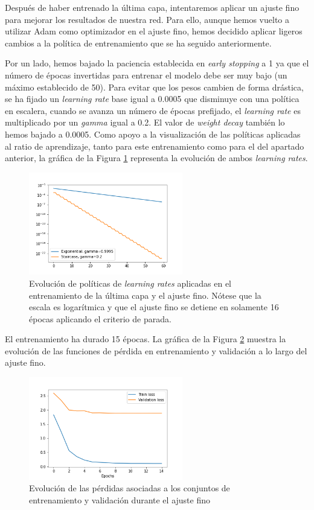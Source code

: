 \documentclass[10pt,a4paper]{article}
\begin{document}
Después de haber entrenado la última capa, intentaremos aplicar un ajuste fino para mejorar los resultados de nuestra red. Para ello, aunque hemos vuelto a utilizar Adam como optimizador en el ajuste fino, hemos decidido aplicar ligeros cambios a la política de entrenamiento que se ha seguido anteriormente. 

Por un lado, hemos bajado la paciencia establecida en \textit{early stopping} a 1 ya que el número de épocas invertidas para entrenar el modelo debe ser muy bajo (un máximo establecido de 50). Para evitar que los pesos cambien de forma drástica, se ha fijado un \textit{learning rate} base igual a 0.0005 que disminuye con una política en escalera, cuando se avanza un número de épocas prefijado, el \textit{learning rate} es multiplicado por un \textit{gamma} igual a 0.2. El valor de \textit{weight decay} también lo hemos bajado a 0.0005. Como apoyo a la visualización de las políticas aplicadas al ratio de aprendizaje, tanto para este entrenamiento como para el del apartado anterior, la gráfica de la Figura \ref{fig:lr_policies} representa la evolución de ambos \textit{learning rates}.

\begin{figure}[h]
	\centering
	\includegraphics[width=0.6\textwidth]{lr_policies}
	\caption{Evolución de políticas de \textit{learning rates} aplicadas en el entrenamiento de la última capa y el ajuste fino. Nótese que la escala es logarítmica y que el ajuste fino se detiene en solamente 16 épocas aplicando el criterio de parada.}
	\label{fig:lr_policies}
\end{figure}


El entrenamiento ha durado 15 épocas. La gráfica de la Figura \ref{fig:loss_cifar_ft} muestra la evolución de las funciones de pérdida en entrenamiento y validación a lo largo del ajuste fino. 


\begin{figure}[h]
	\centering
	\includegraphics[width=0.6\textwidth]{loss_cifar_ft}
	\caption{Evolución de las pérdidas asociadas a los conjuntos de entrenamiento y validación durante el ajuste fino}
	\label{fig:loss_cifar_ft}
\end{figure}
\end{document}
